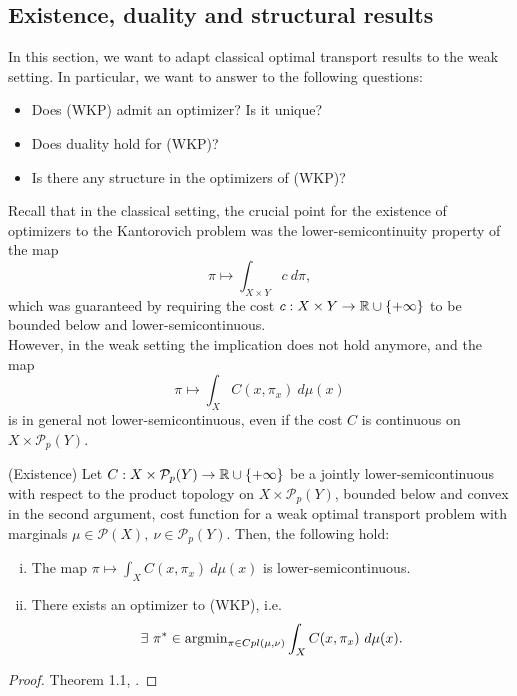 \documentclass[../main.tex]{subfiles}
\begin{document}
\subsection{Existence, duality and structural results}

In this section, we want to adapt classical optimal transport results to the weak setting. In particular, we want to answer to the following questions:
\begin{itemize}
    \item Does (WKP) admit an optimizer? Is it unique?
    \item Does duality hold for (WKP)?
    \item Is there any structure in the optimizers of (WKP)?
\end{itemize}

Recall that in the classical setting, the crucial point for the existence of optimizers to the Kantorovich problem was the lower-semicontinuity property of the map $$\pi \mapsto \int_{X\times Y} c \ d\pi,$$ which was guaranteed by requiring the cost $c: X \times Y \to \mathbb{R}\cup\{+\infty\}$ to be bounded below and lower-semicontinuous. \\
However, in the weak setting the implication does not hold anymore, and the map $$\pi \mapsto \int_X C(x, \pi_x) \ d\mu(x)$$ is in general not lower-semicontinuous, even if the cost $C$ is continuous on $X\times \mathcal{P}_p(Y)$.

\begin{theorem} (Existence)  Let $C: X \times \mathcal{P}_p(Y) \to \mathbb{R}\cup\{+\infty\}$ be a jointly lower-semicontinuous with respect to the product topology on $X\times \mathcal{P}_p(Y)$, bounded below and convex in the second argument, cost function for a weak optimal transport problem with marginals $\mu\in\mathcal{P}(X), \ \nu\in\mathcal{P}_p(Y)$. Then, the following hold:
\begin{enumerate}[(i)]
    \item The map $\pi \mapsto \int_X C(x, \pi_x) \ d\mu(x)$ is lower-semicontinuous.
    \item There exists an optimizer to (WKP), i.e. $$ \exists \ \pi^* \in \text{argmin}_{\pi\in Cpl(\mu, \nu)} \int_X C(x, \pi_x) \ d\mu(x).$$
\end{enumerate}
\end{theorem}
\begin{proof}
    Theorem 1.1, \cite{backhoff2019existence}.
\end{proof}
\end{document}
